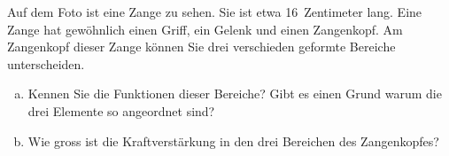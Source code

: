 
\begin{center}
\end{center}

\begin{aufgabe}
	Auf dem Foto ist eine Zange zu sehen. Sie ist etwa \SI{16}{Zentimeter} lang.
	Eine Zange hat gewöhnlich einen Griff, ein Gelenk und einen Zangenkopf.
	Am Zangenkopf dieser Zange können Sie drei verschieden geformte Bereiche unterscheiden.
	\begin{enumerate} [a)]
		\item Kennen Sie die Funktionen dieser Bereiche? Gibt es einen Grund warum die drei Elemente so angeordnet sind?
		\item Wie gross ist die Kraftverstärkung in den drei Bereichen des Zangenkopfes?
	\end{enumerate}
\end{aufgabe}
